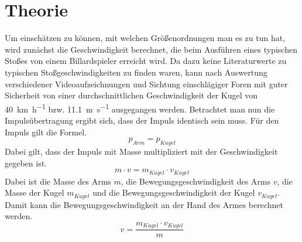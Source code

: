 \chapter{Theorie}
		Um einschätzen zu können, mit welchen Größenordnungen man es zu tun hat, wird zunächst die Geschwindigkeit berechnet, die beim Ausführen eines typischen Stoßes von einem Billardspieler erreicht wird.
		Da dazu keine Literaturwerte zu typischen Stoßgeschwindigkeiten zu finden waren, kann nach Auswertung verschiedener Videoaufzeichnungen und Sichtung einschlägiger Foren mit guter Sicherheit von einer durchschnittlichen Geschwindigkeit der Kugel von \SI{40}{\kilo\metre\per\hour} bzw. \SI{11,1}{\metre\per\second} ausgegangen werden. 
		Betrachtet man nun die Impulsübertragung ergibt sich, dass der Impuls identisch sein muss. 
		Für den Impuls gilt die Formel.
		\begin{equation}
			p_{Arm} = p_{Kugel}
			\label{eq:Impuls}
		\end{equation}
		Dabei gilt, dass der Impuls mit Masse multipliziert mit der Geschwindigkeit gegeben ist.  
		\begin{equation}
			m\cdot v = m_{Kugel} \cdot v_{Kugel}%
			\label{eq:ImpulsKugel}
		\end{equation}
		Dabei ist die Masse des Arms \(m\), die Bewegungsgeschwindigkeit des Arms \(v\), die Masse der Kugel \(m_{Kugel}\) und die Bewegungsgeschwindigkeit der Kugel \(v_{Kugel}\).
		Damit kann die Bewegungsgeschwindigkeit an der Hand des Armes berechnet werden.
		\begin{equation}
			v = \frac{m_{Kugel} \cdot v_{Kugel}}{m}%
			\label{eq:SollgeschwindikeitArm}
		\end{equation}
